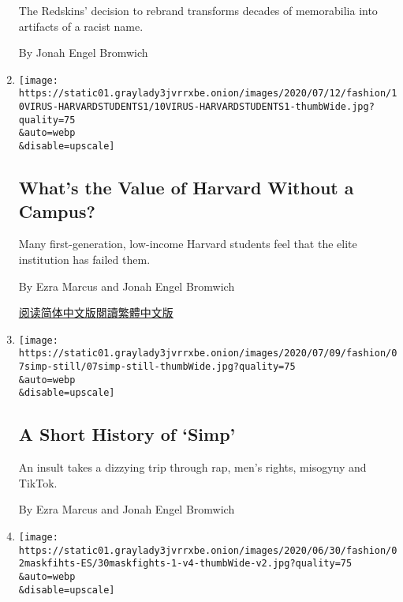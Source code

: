 \begin{enumerate}
  The Redskins' decision to rebrand transforms decades of memorabilia
  into artifacts of a racist name.

  By Jonah Engel Bromwich
\item
  \href{/2020/07/11/style/harvard-students-coronavirus.html}{}

  \texttt{[image: https://static01.graylady3jvrrxbe.onion/images/2020/07/12/fashion/10VIRUS-HARVARDSTUDENTS1/10VIRUS-HARVARDSTUDENTS1-thumbWide.jpg?quality=75\\\&auto=webp\\\&disable=upscale]}

  \hypertarget{whats-the-value-of-harvard-without-a-campus}{%
  \subsection{What's the Value of Harvard Without a
  Campus?}\label{whats-the-value-of-harvard-without-a-campus}}

  Many first-generation, low-income Harvard students feel that the elite
  institution has failed them.

  By Ezra Marcus and Jonah Engel Bromwich

  \href{https://cn.nytimes3xbfgragh.onion/education/20200713/harvard-students-coronavirus/}{阅读简体中文版}\href{https://cn.nytimes3xbfgragh.onion/education/20200713/harvard-students-coronavirus/zhh-hant/}{閱讀繁體中文版}
\item
  \href{/2020/07/07/style/simp-history-slang.html}{}

  \texttt{[image: https://static01.graylady3jvrrxbe.onion/images/2020/07/09/fashion/07simp-still/07simp-still-thumbWide.jpg?quality=75\\\&auto=webp\\\&disable=upscale]}

  \hypertarget{a-short-history-of-simp}{%
  \subsection{A Short History of `Simp'}\label{a-short-history-of-simp}}

  An insult takes a dizzying trip through rap, men's rights, misogyny
  and TikTok.

  By Ezra Marcus and Jonah Engel Bromwich
\item
  \href{/es/2020/07/02/espanol/cubrebocas-pelea-tiendas-video.html}{}

  \texttt{[image: https://static01.graylady3jvrrxbe.onion/images/2020/06/30/fashion/02maskfihts-ES/30maskfights-1-v4-thumbWide-v2.jpg?quality=75\\\&auto=webp\\\&disable=upscale]}

  \hypertarget{a-puuxf1etazos-por-no-llevar-un-cubrebocas-la-nueva-guerra-estadounidense}{%
}
\end{enumerate}
